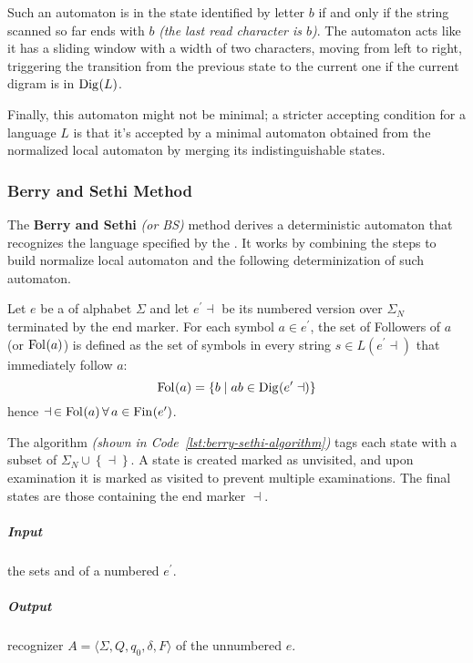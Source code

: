 \documentclass[english]{article}
\begin{document}
Such an automaton is in the state identified by letter \(b\) if and only if the string scanned so far ends with \(b\) \textit{(the last read character is \(b\))}.
The automaton acts like it has a sliding window with a width of two characters, moving from left to right, triggering the transition from the previous state to the current one if the current digram is in \(\text{Dig}\hspace{0.1ex}(L)\).

Finally, this automaton might not be minimal;
a stricter accepting condition for a language \(L\) is that it's accepted by a minimal automaton obtained from the normalized local automaton by merging its indistinguishable states.

\subsubsection{Berry and Sethi Method}

The \textbf{Berry and Sethi} \textit{(or BS)} method derives a deterministic automaton that recognizes the language specified by the \re.
It works by combining the steps to build normalize local automaton and the following determinization of such automaton.

Let \(e\) be a \re of alphabet \(\Sigma\) and let \(e^\prime \dashv\) be its numbered version over \(\Sigma_N\) terminated by the end marker.
For each symbol \(a \in e^\prime\), the set of Followers of \(a\) (or \(\text{Fol}\hspace{0.1ex}(a)\)) is defined as the set of symbols in every string \(s \in L(e^\prime \dashv)\) that immediately follow \(a\):
\[ \text{Fol}\hspace{0.1ex}(a) = \left\{ b \mid ab \in \text{Dig}\hspace{0.1ex}(e^\prime \dashv) \right\} \]
hence \( \dashv \, \in \text{Fol}\hspace{0.1ex}(a) \, \forall \, a \in \text{Fin}\hspace{0.1ex}(e^\prime) \).

The algorithm \textit{(shown in Code~\ref{lst:berry-sethi-algorithm})} tags each state with a subset of \(\Sigma_N \cup \left\{ \dashv \right\}\).
A state is created marked as unvisited, and upon examination it is marked as visited to prevent multiple examinations.
The final states are those containing the end marker \(\dashv\).

\subparagraph*{Input}
the sets \Ini and \Fol of a numbered \re \(e^\prime\).

\subparagraph*{Output}
recognizer \(A = \langle \Sigma, Q, q_0, \delta,  F \rangle\) of the unnumbered \re \(e\).
\end{document}
